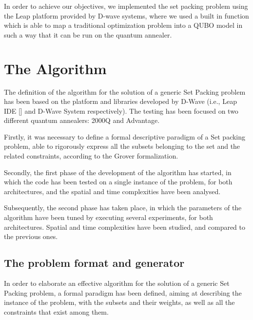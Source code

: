 \documentclass[oneside,a4paper]{article}
\begin{document}
In order to achieve our objectives, we implemented the set packing problem using the Leap platform provided by D-wave systems, where we used a built in function which is able to map a traditional optimization problem into a QUBO model in such a way that it can be run on the quantum annealer.

\section{The Algorithm}
The definition of the algorithm for the solution of a generic Set Packing problem has been based on the platform and libraries developed by D-Wave (i.e., Leap IDE [] and D-Wave System respectively). The testing has been focused on two different quantum annealers: 2000Q and Advantage.

Firstly, it was necessary to define a formal descriptive paradigm of a Set packing problem, able to rigorously express all the subsets belonging to the set and the related constraints, according to the Grover formalization. 

Secondly, the first phase of the development of the algorithm has started, in which the code has been tested on a single instance of the problem, for both architectures, and the spatial and time complexities have been analysed.

Subsequently, the second phase has taken place, in which the parameters of the algorithm have been tuned by executing several experiments, for both architectures. Spatial and time complexities have been studied, and compared to the previous ones. 
\subsection{The problem format and generator}
In order to elaborate an effective algorithm for the solution of a generic Set Packing problem, a formal paradigm has been defined, aiming at describing the instance of the problem, with the subsets and their weights, as well as all the constraints that exist among them.
\end{document}

